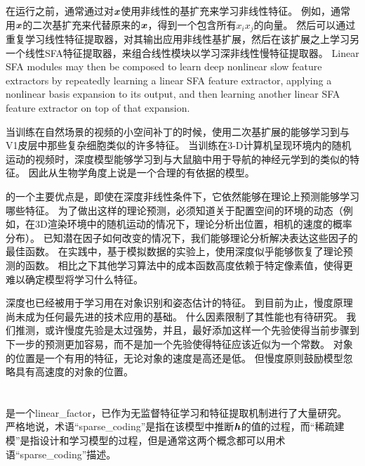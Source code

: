 在运行之前，通常通过对$\boldsymbol{\mathit{x}}$使用非线性的基扩充来学习非线性特征。
例如，通常用$\boldsymbol{\mathit{x}}$的二次基扩充来代替原来的$\boldsymbol{\mathit{x}}$，得到一个包含所有$x_ix_j$的向量。
然后可以通过重复学习线性特征提取器，对其输出应用非线性基扩展，然后在该扩展之上学习另一个线性SFA特征提取器，来组合线性模块以学习深非线性慢特征提取器。
Linear SFA modules may then be composed to learn deep nonlinear slow feature extractors by repeatedly learning a linear SFA feature extractor, applying a nonlinear basis expansion to its output, and then learning another linear SFA feature extractor on top of that expansion.


当训练在自然场景的视频的小空间补丁的时候，使用二次基扩展的能够学习到与V1皮层中那些复杂细胞类似的许多特征\citep{Berkes-Wiskott-2005}。
当训练在3-D计算机呈现环境内的随机运动的视频时，深度模型能够学习到与大鼠脑中用于导航的神经元学到的类似的特征\citep{franzius2007slowness}。
因此从生物学角度上说是一个合理的有依据的模型。



的一个主要优点是，即使在深度非线性条件下，它依然能够在理论上预测能够学习哪些特征。
为了做出这样的理论预测，必须知道关于配置空间的环境的动态（例如，在3D渲染环境中的随机运动的情况下，理论分析出位置，相机的速度的概率分布）。
已知潜在因子如何改变的情况下，我们能够理论分析解决表达这些因子的最佳函数。
在实践中，基于模拟数据的实验上，使用深度似乎能够恢复了理论预测的函数。
相比之下其他学习算法中的成本函数高度依赖于特定像素值，使得更难以确定模型将学习什么特征。


深度也已经被用于学习用在对象识别和姿态估计的特征\citep{Franzius2008}。
到目前为止，慢度原理尚未成为任何最先进的技术应用的基础。
什么因素限制了其性能也有待研究。
我们推测，或许慢度先验是太过强势，并且，最好添加这样一个先验使得当前步骤到下一步的预测更加容易，而不是加一个先验使得特征应该近似为一个常数。
对象的位置是一个有用的特征，无论对象的速度是高还是低。 但慢度原则鼓励模型忽略具有高速度的对象的位置。


\section{}
\label{sec:sparse_coding}


\citep{Olshausen+Field-1996}是一个\gls{linear_factor}，已作为无监督特征学习和特征提取机制进行了大量研究。
严格地说，术语“\gls{sparse_coding}”是指在该模型中推断$\boldsymbol{\mathit{h}}$的值的过程，而“稀疏建模”是指设计和学习模型的过程，但是通常这两个概念都可以用术语“\gls{sparse_coding}”描述。

